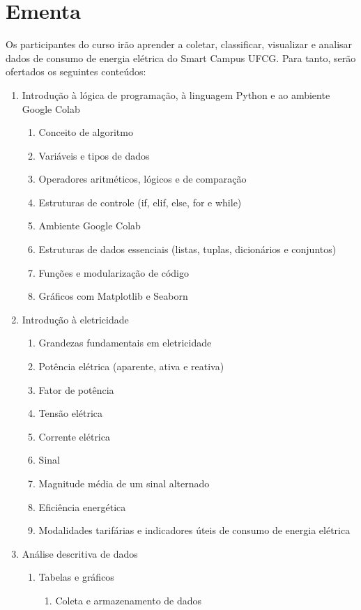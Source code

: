 \section{Ementa}
Os participantes do curso irão aprender a coletar, classificar, visualizar e analisar dados de consumo de energia elétrica do Smart Campus UFCG. Para tanto, serão ofertados os seguintes conteúdos:

\begin{enumerate}
	\item Introdução à lógica de programação, à linguagem Python e ao ambiente Google Colab
		\begin{enumerate}
			\item Conceito de algoritmo
			\item Variáveis e tipos de dados
			\item Operadores aritméticos, lógicos e de comparação
			\item Estruturas de controle (if, elif, else, for e while)
			\item Ambiente Google Colab
			\item Estruturas de dados essenciais (listas, tuplas, dicionários e conjuntos)
			\item Funções e modularização de código
			\item Gráficos com Matplotlib e Seaborn
		\end{enumerate}
	\item Introdução à eletricidade
		\begin{enumerate}
			\item Grandezas fundamentais em eletricidade
			\item Potência elétrica (aparente, ativa e reativa)
			\item Fator de potência
			\item Tensão elétrica
			\item Corrente elétrica
			\item Sinal
			\item Magnitude média de um sinal alternado
			\item Eficiência energética
			\item Modalidades tarifárias e indicadores úteis de consumo de energia elétrica
		\end{enumerate}
	\item Análise descritiva de dados
		\begin{enumerate}
			\item Tabelas e gráficos
			\begin{enumerate}
				\item Coleta e armazenamento de dados

\end{enumerate}
\end{enumerate}
\end{enumerate}
